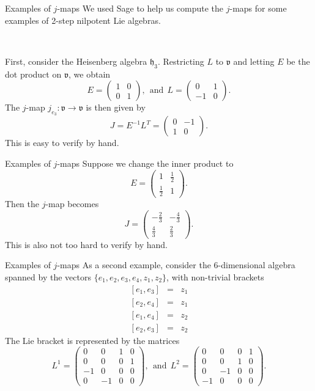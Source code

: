 \documentclass{beamer}
\newcommand{\br}[2]{\left[#1,#2\right]}
\newcommand{\lal}[1]{\mathfrak{#1}}
\newcommand{\lav}{\lal{v}}
\begin{document}

\begin{frame}{Examples of $j$-maps}
We used Sage to help us compute the $j$-maps for some examples of 2-step nilpotent
Lie algebras.
\pause

\

First, consider the Heisenberg algebra $\lal{h}_3$. Restricting $L$ to $\lav$ and
letting $E$ be the dot product on $\lav$, we obtain
$$
E = \begin{pmatrix}
1 & 0 \\ 0 & 1
\end{pmatrix},\ \ \text{and}\ \ L = \begin{pmatrix}
0 & 1 \\ -1 & 0
\end{pmatrix}.
$$
\pause
The $j$-map $j_{e_3} :\lav \to \lav$ is then given by 
$$
J = E^{-1}L^T = \begin{pmatrix}
0 & -1 \\ 1 & 0
\end{pmatrix}.
$$
This is easy to verify by hand.
\end{frame}

\begin{frame}{Examples of $j$-maps}
Suppose we change the inner product to
$$
E = \begin{pmatrix}
1 & \frac{1}{2} \\[0.5 ex] \frac{1}{2} & 1
\end{pmatrix}.
$$
Then the $j$-map becomes
$$
J = \begin{pmatrix}
-\frac{2}{3} & -\frac{4}{3} \\[0.5 ex] \frac{4}{3} & \frac{2}{3}
\end{pmatrix}.
$$
This is also not too hard to verify by hand.
\end{frame}

\begin{frame}{Examples of $j$-maps}
As a second example, consider the 6-dimensional algebra spanned by the vectors
$\{e_1,e_2,e_3,e_4,z_1,z_2\}$, with non-trivial brackets
\begin{eqnarray*}
\br{e_1}{e_3} & = & z_1 \\
\br{e_2}{e_4} & = & z_1 \\
\br{e_1}{e_4} & = & z_2 \\
\br{e_2}{e_3} & = & z_2
\end{eqnarray*}
The Lie bracket is represented by the matrices
$$
L^1 = \begin{pmatrix}
0 & 0 & 1 & 0 \\
0 & 0 & 0 & 1 \\
-1 & 0 & 0 & 0 \\
0 & -1 & 0 & 0
\end{pmatrix},\ \ \text{and}\ \ L^2 = \begin{pmatrix}
0 & 0 & 0 & 1 \\
0 & 0 & 1 & 0 \\
0 & -1 & 0 & 0 \\
-1 & 0 & 0 & 0 
\end{pmatrix}.
$$
\end{frame}
\end{document}
